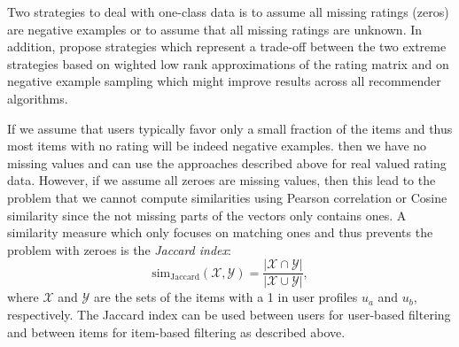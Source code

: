 \documentclass[nojss]{jss}
\newcommand{\set}[1]{\mathcal{#1}}
\begin{document}
Two strategies to deal with one-class data is to assume all missing ratings
(zeros) are negative examples or to assume that all missing ratings are unknown.
In addition,
\cite{recommender:Pan:2008} propose strategies which represent a
trade-off between the two extreme strategies based on wighted low rank
approximations of the rating matrix and on negative example sampling which
might improve results across all recommender algorithms.

If we assume that users  typically favor only a small fraction of the items and thus most items with no rating will be indeed negative examples.
then we have no missing values and can use the approaches
described above for real valued rating data. However,
if we assume all zeroes are missing values, then this lead
to the problem that we cannot compute similarities using
Pearson correlation or Cosine similarity since the
not missing parts of the vectors only contains ones.
A similarity measure which
only focuses on matching ones
and thus prevents the problem with zeroes
is the \emph{Jaccard index}:
\begin{equation}
\mathrm{sim_{Jaccard}}(\set{X},\set{Y}) = \frac{|\set{X}\cap \set{Y}|}
{|\set{X}\cup \set{Y}|},
\end{equation}
where
$\set{X}$ and $\set{Y}$ are the sets of the items with a 1 in user profiles
$u_a$ and $u_b$, respectively.
The Jaccard index can be used between users for user-based filtering
and between items for item-based filtering as described above.

\end{document}
